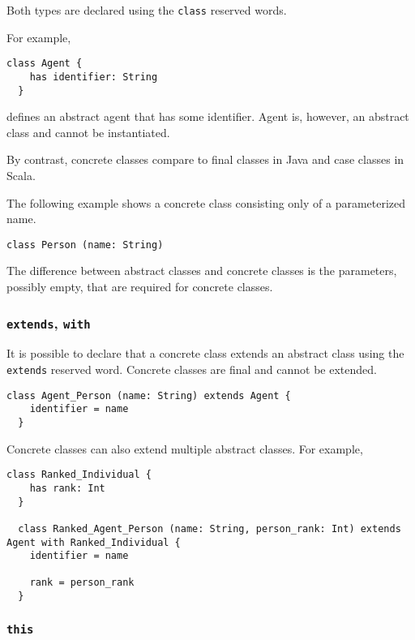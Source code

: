 \documentclass[12pt,a4paper]{book}
\newcommand{\srccode}[1]{\texttt{{#1}}}
\newcommand{\reservedWord}[1]{{\color{blue}\srccode{#1}}\xspace}
\newcommand{\sclass}{\reservedWord{class}}
\newcommand{\sextends}{\reservedWord{extends}}
\newcommand{\swith}{\reservedWord{with}}
\newcommand{\sthis}{\reservedWord{this}}
\begin{document}
    Both types are declared using the \sclass reserved words.

    For example,
    \begin{lstlisting}[label={lst:exampleAbstractClass}]
  class Agent {
    has identifier: String
  }
    \end{lstlisting}
    defines an abstract agent that has some identifier.
    Agent is, however, an abstract class and cannot be instantiated.

    By contrast, concrete classes compare to final classes in Java and case classes in Scala.

    The following example shows a concrete class consisting only of a parameterized name.
    \begin{lstlisting}[label={lst:exampleConcreteClass}]
  class Person (name: String)
    \end{lstlisting}

    The difference between abstract classes and concrete classes is the parameters, possibly empty, that are required for concrete classes.

    \subsubsection{\sextends, \swith}

    It is possible to declare that a concrete class extends an abstract class using the \sextends reserved word.
    Concrete classes are final and cannot be extended.

    \begin{lstlisting}[label={lst:exampleExtends}]
  class Agent_Person (name: String) extends Agent {
    identifier = name
  }
    \end{lstlisting}

    Concrete classes can also extend multiple abstract classes.
    For example,
    \begin{lstlisting}[label={lst:exampleWith}]
  class Ranked_Individual {
    has rank: Int
  }

  class Ranked_Agent_Person (name: String, person_rank: Int) extends Agent with Ranked_Individual {
    identifier = name

    rank = person_rank
  }
    \end{lstlisting}

    \subsubsection{\sthis}
\end{document}

